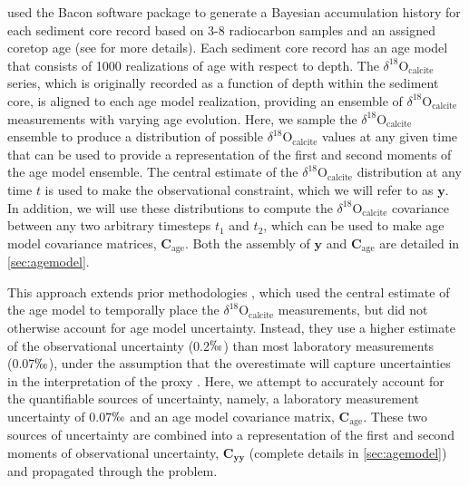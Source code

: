 \documentclass[draft]{agujournal2019}
\begin{document}
 used the Bacon software package \cite{Bacon, McKay-Emile-Geay-2021:R} to generate a Bayesian accumulation history for each sediment core record based on 3-8 radiocarbon samples and an assigned coretop age (see  for more details). Each sediment core record has an age model that consists of 1000 realizations of age with respect to depth. The $\delta^{18}\mathrm{O}_{\mathrm{calcite}}$ series, which is originally recorded as a function of depth within the sediment core, is aligned to each age model realization, providing an ensemble of $\delta^{18}\mathrm{O}_{\mathrm{calcite}}$ measurements with varying age evolution. Here, we sample the $\delta^{18}\mathrm{O}_{\mathrm{calcite}}$ ensemble to produce a distribution of possible $\delta^{18}\mathrm{O}_{\mathrm{calcite}}$ values at any given time that can be used to provide a representation of the first and second moments of the age model ensemble. The central estimate of the $\delta^{18}\mathrm{O}_{\mathrm{calcite}}$ distribution at any time $t$ is used to make the observational constraint, which we will refer to as $\mathbf{y}$. In addition, we will use these distributions to compute the $\delta^{18}\mathrm{O}_{\mathrm{calcite}}$ covariance between any two arbitrary timesteps $t_{1}$ and $t_{2}$, which can be used to make age model covariance matrices, $\mathbf{C}_{\mathrm{age}}$. Both the assembly of $\mathbf{y}$ and $\mathbf{C}_{\mathrm{age}}$ are detailed in \ref{sec:agemodel}.

This approach extends prior methodologies \cite[]{LeGrand-Wunsch-1995:Constraints, Gebbie2006, Marchal-Curry-2008:Abyssal, Amrhein-Gebbie-2015:Inferring}, which used the central estimate of the age model to temporally place the $\delta^{18}\mathrm{O}_{\mathrm{calcite}}$ measurements, but did not otherwise account for age model uncertainty. Instead, they use a higher estimate of the observational uncertainty (0.2$\permil$) than most laboratory measurements (0.07$\permil$), under the assumption that the overestimate will capture uncertainties in the interpretation of the proxy \cite{Gebbie2006}. Here, we attempt to accurately account for the quantifiable sources of uncertainty, namely, a laboratory measurement uncertainty of 0.07$\permil$ \cite[]{Lu-Oppo-2023:Surface} and an age model covariance matrix, $\mathbf{C}_{\mathrm{age}}$. These two sources of uncertainty are combined into a representation of the first and second moments of observational uncertainty, $\mathbf{C_{yy}}$ (complete details in \ref{sec:agemodel}) and propagated through the problem. 
\end{document}
